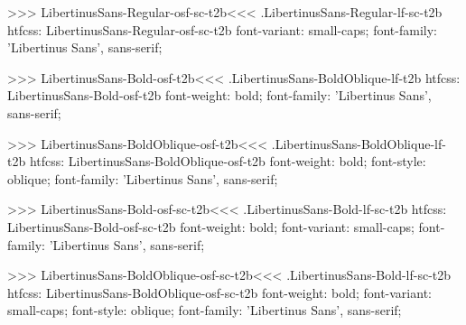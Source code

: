{{{{{>>>
\<LibertinusSans-Regular-osf-sc-t2b\><<<
.LibertinusSans-Regular-lf-sc-t2b
htfcss:  LibertinusSans-Regular-osf-sc-t2b  font-variant: small-caps; font-family: 'Libertinus Sans', sans-serif;

>>>
\<LibertinusSans-Bold-osf-t2b\><<<
.LibertinusSans-BoldOblique-lf-t2b
htfcss:  LibertinusSans-Bold-osf-t2b  font-weight: bold; font-family: 'Libertinus Sans', sans-serif;

>>>
\<LibertinusSans-BoldOblique-osf-t2b\><<<
.LibertinusSans-BoldOblique-lf-t2b
htfcss:  LibertinusSans-BoldOblique-osf-t2b  font-weight: bold; font-style: oblique; font-family: 'Libertinus Sans', sans-serif;

>>>
\<LibertinusSans-Bold-osf-sc-t2b\><<<
.LibertinusSans-Bold-lf-sc-t2b
htfcss:  LibertinusSans-Bold-osf-sc-t2b  font-weight: bold; font-variant: small-caps; font-family: 'Libertinus Sans', sans-serif;

>>>
\<LibertinusSans-BoldOblique-osf-sc-t2b\><<<
.LibertinusSans-Bold-lf-sc-t2b
htfcss:  LibertinusSans-BoldOblique-osf-sc-t2b  font-weight: bold; font-variant: small-caps; font-style: oblique; font-family: 'Libertinus Sans', sans-serif;

}}}}}

